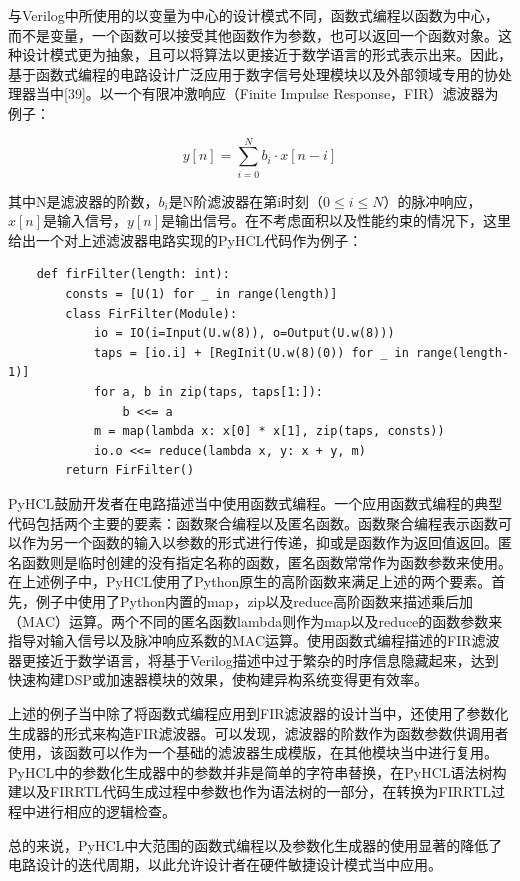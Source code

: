 与Verilog中所使用的以变量为中心的设计模式不同，函数式编程以函数为中心，而不是变量，一个函数可以接受其他函数作为参数，也可以返回一个函数对象。这种设计模式更为抽象，且可以将算法以更接近于数学语言的形式表示出来。因此，基于函数式编程的电路设计广泛应用于数字信号处理模块以及外部领域专用的协处理器当中[39]。以一个有限冲激响应（Finite Impulse Response，FIR）滤波器为例子：

\begin{equation}
	y[n]=\sum_{i=0}^N b_i \cdot x[n-i]
\end{equation}

其中N是滤波器的阶数，$b_i$是N阶滤波器在第i时刻（$0 \leq i \leq N$）的脉冲响应，$x[n]$是输入信号，$y[n]$是输出信号。在不考虑面积以及性能约束的情况下，这里给出一个对上述滤波器电路实现的PyHCL代码作为例子：

\begin{lstlisting}
	def firFilter(length: int):
		consts = [U(1) for _ in range(length)]
		class FirFilter(Module):
			io = IO(i=Input(U.w(8)), o=Output(U.w(8)))
			taps = [io.i] + [RegInit(U.w(8)(0)) for _ in range(length-1)]
			for a, b in zip(taps, taps[1:]):
				b <<= a
			m = map(lambda x: x[0] * x[1], zip(taps, consts))
			io.o <<= reduce(lambda x, y: x + y, m)
		return FirFilter()
\end{lstlisting}

PyHCL鼓励开发者在电路描述当中使用函数式编程。一个应用函数式编程的典型代码包括两个主要的要素：函数聚合编程以及匿名函数。函数聚合编程表示函数可以作为另一个函数的输入以参数的形式进行传递，抑或是函数作为返回值返回。匿名函数则是临时创建的没有指定名称的函数，匿名函数常常作为函数参数来使用。在上述例子中，PyHCL使用了Python原生的高阶函数来满足上述的两个要素。首先，例子中使用了Python内置的map，zip以及reduce高阶函数来描述乘后加（MAC）运算。两个不同的匿名函数lambda则作为map以及reduce的函数参数来指导对输入信号以及脉冲响应系数的MAC运算。使用函数式编程描述的FIR滤波器更接近于数学语言，将基于Verilog描述中过于繁杂的时序信息隐藏起来，达到快速构建DSP或加速器模块的效果，使构建异构系统变得更有效率。

上述的例子当中除了将函数式编程应用到FIR滤波器的设计当中，还使用了参数化生成器的形式来构造FIR滤波器。可以发现，滤波器的阶数作为函数参数供调用者使用，该函数可以作为一个基础的滤波器生成模版，在其他模块当中进行复用。PyHCL中的参数化生成器中的参数并非是简单的字符串替换，在PyHCL语法树构建以及FIRRTL代码生成过程中参数也作为语法树的一部分，在转换为FIRRTL过程中进行相应的逻辑检查。

总的来说，PyHCL中大范围的函数式编程以及参数化生成器的使用显著的降低了电路设计的迭代周期，以此允许设计者在硬件敏捷设计模式当中应用。

